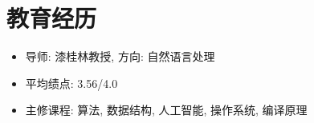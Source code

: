 \section{教育经历}
\begin{itemize}
  \item 导师: 漆桂林教授, 方向: 自然语言处理
  \item 平均绩点: 3.56/4.0
  \item 主修课程: 算法, 数据结构, 人工智能, 操作系统, 编译原理
\end{itemize}